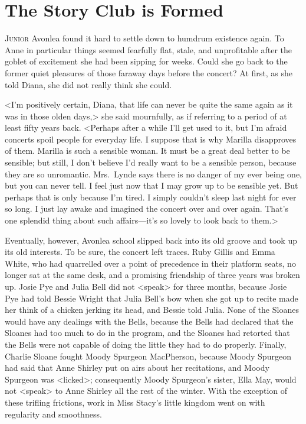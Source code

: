 \chapter{The Story Club is Formed}

\lettrine{J}{unior} Avonlea found it hard to settle down to humdrum existence again. To Anne in particular things seemed fearfully flat, stale, and unprofitable after the goblet of excitement she had been sipping for weeks. Could she go back to the former quiet pleasures of those faraway days before the concert? At first, as she told Diana, she did not really think she could.

<I'm positively certain, Diana, that life can never be quite the same again as it was in those olden days,> she said mournfully, as if referring to a period of at least fifty years back. <Perhaps after a while I'll get used to it, but I'm afraid concerts spoil people for everyday life. I suppose that is why Marilla disapproves of them. Marilla is such a sensible woman. It must be a great deal better to be sensible; but still, I don't believe I'd really want to be a sensible person, because they are so unromantic. Mrs.~Lynde says there is no danger of my ever being one, but you can never tell. I feel just now that I may grow up to be sensible yet. But perhaps that is only because I'm tired. I simply couldn't sleep last night for ever so long. I just lay awake and imagined the concert over and over again. That's one splendid thing about such affairs—it's so lovely to look back to them.>

Eventually, however, Avonlea school slipped back into its old groove and took up its old interests. To be sure, the concert left traces. Ruby Gillis and Emma White, who had quarrelled over a point of precedence in their platform seats, no longer sat at the same desk, and a promising friendship of three years was broken up. Josie Pye and Julia Bell did not <speak> for three months, because Josie Pye had told Bessie Wright that Julia Bell's bow when she got up to recite made her think of a chicken jerking its head, and Bessie told Julia. None of the Sloanes would have any dealings with the Bells, because the Bells had declared that the Sloanes had too much to do in the program, and the Sloanes had retorted that the Bells were not capable of doing the little they had to do properly. Finally, Charlie Sloane fought Moody Spurgeon MacPherson, because Moody Spurgeon had said that Anne Shirley put on airs about her recitations, and Moody Spurgeon was <licked>; consequently Moody Spurgeon's sister, Ella May, would not <speak> to Anne Shirley all the rest of the winter. With the exception of these trifling frictions, work in Miss Stacy's little kingdom went on with regularity and smoothness.

